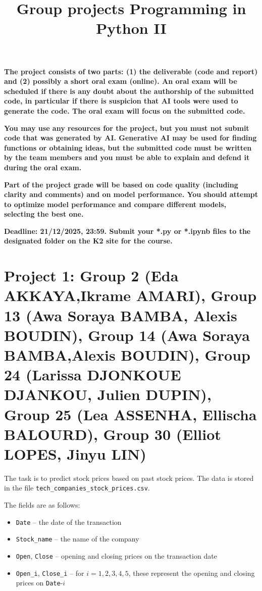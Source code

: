 \documentclass{article}
\title{Group projects Programming in Python II}
\author{}
\date{}
\begin{document}
\maketitle

\textbf{The project consists of two parts: (1) the deliverable (code and report) and (2) possibly a short oral exam (online). An oral exam will be scheduled if there is any doubt about the authorship of the submitted code, in particular if there is suspicion that AI tools were used to generate the code. The oral exam will focus on the submitted code.}

\textbf{You may use any resources for the project, but you must not submit code that was generated by AI. Generative AI may be used for finding functions or obtaining ideas, but the submitted code must be written by the team members and you must be able to explain and defend it during the oral exam.}

\textbf{Part of the project grade will be based on code quality (including clarity and comments) and on model performance. You should attempt to optimize model performance and compare different models, selecting the best one.}

\textbf{Deadline: 21/12/2025, 23:59. Submit your *.py or *.ipynb files to the designated folder on the K2 site for the course.}
















\section*{Project 1: Group 2 (Eda	AKKAYA,Ikrame	AMARI), Group 13 (Awa Soraya	BAMBA, Alexis	BOUDIN), 
Group 14 (Awa Soraya	BAMBA,Alexis	BOUDIN), Group 24 (Larissa	DJONKOUE DJANKOU,
Julien	DUPIN), Group 25 (Lea	ASSENHA, Ellischa	BALOURD), Group 30 (Elliot	LOPES, Jinyu	LIN)
}
The task is to predict stock prices based on past stock prices. The data is stored in the file \lstinline$tech_companies_stock_prices.csv$.

The fields are as follows:
\begin{itemize} \item \lstinline$Date$ -- the date of the transaction 
\item \lstinline$Stock_name$ -- the name of the company 
\item \lstinline$Open$, \lstinline$Close$ -- opening and closing prices on the transaction date 
\item \lstinline$Open_i$, \lstinline$Close_i$ -- for $i=1,2,3,4,5$, these represent the opening and closing prices on \lstinline$Date$-$i$ 
\end{itemize}
\end{document}

